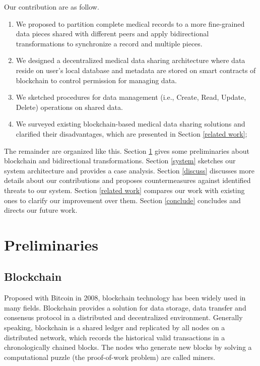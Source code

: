 \documentclass[conference]{IEEEtran}
\begin{document}
Our contribution are as follow.
\begin{enumerate}

	\item We proposed to partition complete medical records to a more fine-grained data pieces shared with different peers and apply bidirectional transformations to synchronize a record and multiple pieces.
	
	\item We designed  a decentralized medical data sharing architecture where data reside on user's local database and metadata are stored on smart contracts of blockchain to control permission for managing data.
		
	\item We sketched procedures for data management (i.e., Create, Read, Update, Delete) operations on shared data.
	
	\item We surveyed existing blockchain-based medical data sharing solutions and clarified their disadvantages, which are presented in Section \ref{related work};

\end{enumerate}

The remainder are organized like this. Section \ref{preli} gives some preliminaries about blockchain and bidirectional transformations. Section \ref{system} sketches our system architecture and provides a case analysis. Section \ref{discuss} discusses more details about our contributions and proposes countermeasures against identified threats to our system. Section \ref{related work} compares our work with existing ones to clarify our improvement over them. Section \ref{conclude} concludes and directs our future work.

\section{Preliminaries}
\label{preli}

	\subsection{Blockchain}
	Proposed with Bitcoin \cite{nakamoto2008bitcoin} in 2008, blockchain technology has been widely used in many fields. Blockchain provides a solution for data storage, data transfer and consensus protocol in a distributed and decentralized environment. Generally speaking, blockchain is a shared ledger and replicated by all nodes on a distributed network, which records the historical valid transactions in a chronologically chained blocks. The nodes who generate new blocks by solving a computational puzzle (the proof-of-work problem) are called miners.
	
\end{document}
